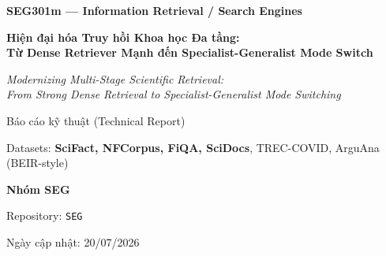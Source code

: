 \documentclass[11pt,a4paper]{article}
\newcommand{\segbibstyle}{plainnat}
\newcommand{\segbibstyle}{plain}
\begin{document}
\begin{titlepage}
\centering
\vspace*{1.5cm}
{\Large\bfseries SEG301m — Information Retrieval / Search Engines\par}
\vspace{1.2cm}
{\LARGE\bfseries Hiện đại hóa Truy hồi Khoa học Đa tầng:\\[4pt] Từ Dense Retriever Mạnh đến Specialist-Generalist Mode Switch\par}
\vspace{0.5cm}
{\large\itshape Modernizing Multi-Stage Scientific Retrieval:\\ From Strong Dense Retrieval to Specialist-Generalist Mode Switching\par}
\vspace{1.5cm}
{\large Báo cáo kỹ thuật (Technical Report)\par}
\vspace{0.3cm}
{\normalsize Datasets: \textbf{SciFact, NFCorpus, FiQA, SciDocs}, TREC-COVID, ArguAna (BEIR-style)\par}
\vspace{2.0cm}
{\large\bfseries Nhóm SEG\par}
\vspace{0.3cm}
{\normalsize Repository: \texttt{SEG}\par}
\vfill
{\normalsize Ngày cập nhật: 20/07/2026\par}
\end{titlepage}



\tableofcontents
\clearpage















\end{document}
